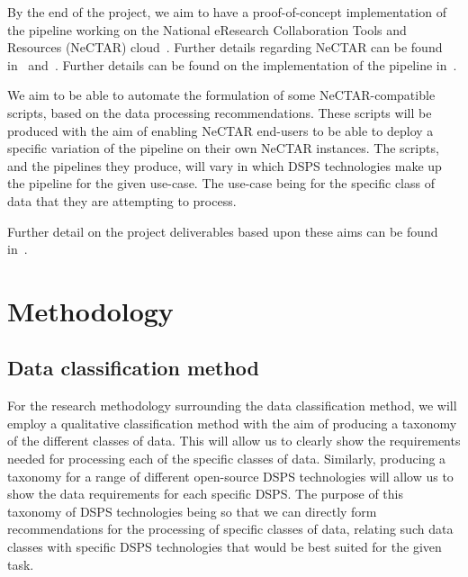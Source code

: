 \documentclass[a4paper,11pt]{article}
\begin{document}
By the end of the project, we aim to have a proof-of-concept implementation of the pipeline working on the National
eResearch Collaboration Tools and Resources (NeCTAR) cloud~\cite{web:Nectar}. Further details regarding NeCTAR can be
found in~ and~. Further details can be found on the
implementation of the pipeline in~.

We aim to be able to automate the formulation of some NeCTAR-compatible scripts, based on the data processing
recommendations. These scripts will be produced with the aim of enabling NeCTAR end-users to be able to deploy a
specific variation of the pipeline on their own NeCTAR instances. The scripts, and the pipelines they produce, will vary in
which DSPS technologies make up the pipeline for the given use-case. The use-case being for the specific class of data that
they are attempting to process.

Further detail on the project deliverables based upon these aims can be found in~.




\newpage


\section{Methodology} %
\label{sec:methodology}

\subsection{Data classification method} %
\label{sub:data_classification_method}

For the research methodology surrounding the data classification method, we will employ a qualitative classification
method with the aim of producing a taxonomy of the different classes of data. This will allow us to clearly show the
requirements needed for processing each of the specific classes of data. Similarly, producing a taxonomy for a range of
different open-source DSPS technologies will allow us to show the data requirements for each specific DSPS. The purpose
of this taxonomy of DSPS technologies being so that we can directly form recommendations for the processing of specific
classes of data, relating such data classes with specific DSPS technologies that would be best suited for the given
task.
\end{document}
